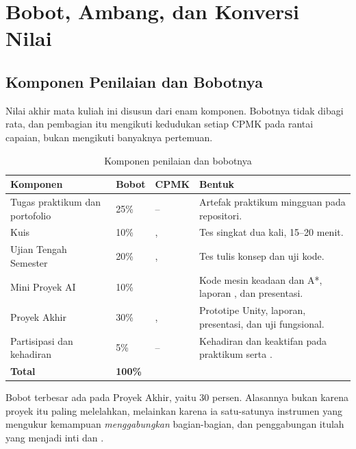 \section{Bobot, Ambang, dan Konversi Nilai}
\label{sec:bobot-nilai}

\subsection{Komponen Penilaian dan Bobotnya}

Nilai akhir mata kuliah ini disusun dari enam komponen. Bobotnya tidak
dibagi rata, dan pembagian itu mengikuti kedudukan setiap CPMK pada rantai
capaian, bukan mengikuti banyaknya pertemuan.

\begin{table}[htbp]
\centering
\caption{Komponen penilaian dan bobotnya}
\label{tab:komponen-nilai}
{\setlength{\tabcolsep}{4pt}\footnotesize%
\begin{tabularx}{\textwidth}{@{}L{4.4cm} C{1.5cm} C{2.1cm} Y@{}}
\toprule
\headrow \textbf{Komponen} & \textbf{Bobot} & \textbf{CPMK} & \textbf{Bentuk} \\
\midrule
Tugas praktikum dan portofolio & 25\% & -- &
Artefak praktikum mingguan pada repositori. \\
\addlinespace
Kuis & 10\% & ,  &
Tes singkat dua kali, 15--20 menit. \\
\addlinespace
Ujian Tengah Semester & 20\% & ,  &
Tes tulis konsep dan uji kode. \\
\addlinespace
Mini Proyek AI & 10\% &  &
Kode mesin keadaan dan A*, laporan , dan presentasi. \\
\addlinespace
Proyek Akhir & 30\% & ,  &
Prototipe Unity, laporan, presentasi, dan uji fungsional. \\
\addlinespace
Partisipasi dan kehadiran & 5\% & -- &
Kehadiran dan keaktifan pada praktikum serta . \\
\midrule
\textbf{Total} & \textbf{100\%} & & \\
\bottomrule
\end{tabularx}}
\end{table}

Bobot terbesar ada pada Proyek Akhir, yaitu 30 persen. Alasannya bukan karena
proyek itu paling melelahkan, melainkan karena ia satu-satunya instrumen yang
mengukur kemampuan \emph{menggabungkan} bagian-bagian, dan penggabungan itulah
yang menjadi inti  dan .

